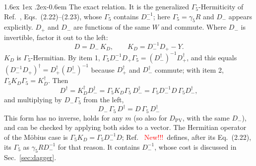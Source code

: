 \documentclass[11pt,a4paper]{article}
\makeatletter
\newif\ifshownew \shownewtrue
\DeclareRobustCommand\New{\ifshownew\textcolor{red}{New!!!}\ \else\ignorespaces\fi}
\renewcommand\paragraph{\@startsection{paragraph}{4}{\z@}%
  {1.6ex \@plus 1ex \@minus .2ex}{-0.6em}%
  {\normalfont\normalsize\itshape}}
\numberwithin{equation}{section}
\newcommand{\dg}{^{\dagger}}
\newcommand{\Dpv}{D_{\mathrm{PV}}}
\newcommand{\Gfive}{\Gamma_5}
\makeatother
\begin{document}
\paragraph{The exact relation.} It is the generalized $\Gfive$-Hermiticity of
Ref.~\cite{BNO}, Eqs.~(2.22)--(2.23), whose $\Gfive$ contains $D_-^{-1}$; here $\Gfive=\gamma_5R$
and $D_-$ appears explicitly. $D_+$ and $D_-$ are functions of the same $W$ and commute.
Where $D_-$ is invertible, factor it out to the left:
\begin{equation}
D=D_-\,K_{D},\qquad K_{D}=D_-^{-1}D_+-Y .
\end{equation}
$K_D$ is $\Gfive$-Hermitian. By item 1, $\Gfive D_-^{-1}D_+\Gfive=(D_-\dg)^{-1}D_+\dg$, and
this equals $(D_-^{-1}D_+)\dg=D_+\dg(D_-\dg)^{-1}$ because $D_+\dg$ and $D_-\dg$ commute;
with item 2, $\Gfive K_D\Gfive=K_D\dg$. Then
\begin{equation}
D\dg=K_D\dg D_-\dg=\Gfive K_D\Gfive\,D_-\dg=\Gfive D_-^{-1}D\,\Gfive D_-\dg ,
\end{equation}
and multiplying by $D_-\Gfive$ from the left,
\begin{equation}
\boxed{\;D_-\,\Gfive\,D\dg=D\,\Gfive\,D_-\dg\;}
\label{eq:g5exact}
\end{equation}
This form has no inverse, holds for any $m$ (so also for $\Dpv$, with the same $D_-$), and can
be checked by applying both sides to a vector. The Hermitian operator
of the M\"obius case is $\Gfive K_D=\Gfive D_-^{-1}D$; Ref.~\cite{BNO} \New defines, after its Eq.~(2.22),
its $\Gamma_5$ as $\gamma_5RD_-^{-1}$ for that reason. It contains $D_-^{-1}$, whose cost
is discussed in Sec.~\ref{sec:dagger}.
\end{document}
